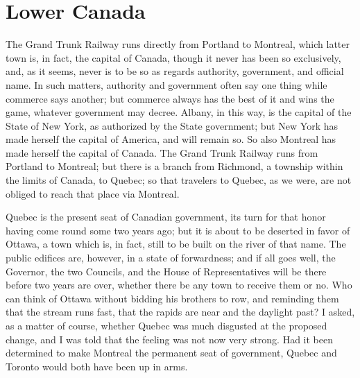 \chapter{Lower Canada}


The Grand Trunk Railway runs directly from Portland to Montreal,
which latter town is, in fact, the capital of Canada, though it
never has been so exclusively, and, as it seems, never is to be so
as regards authority, government, and official name.  In such
matters, authority and government often say one thing while
commerce says another; but commerce always has the best of it and
wins the game, whatever government may decree.  Albany, in this
way, is the capital of the State of New York, as authorized by the
State government; but New York has made herself the capital of
America, and will remain so.  So also Montreal has made herself the
capital of Canada.  The Grand Trunk Railway runs from Portland to
Montreal; but there is a branch from Richmond, a township within
the limits of Canada, to Quebec; so that travelers to Quebec, as we
were, are not obliged to reach that place via Montreal.

Quebec is the present seat of Canadian government, its turn for
that honor having come round some two years ago; but it is about to
be deserted in favor of Ottawa, a town which is, in fact, still to
be built on the river of that name.  The public edifices are,
however, in a state of forwardness; and if all goes well, the
Governor, the two Councils, and the House of Representatives will
be there before two years are over, whether there be any town to
receive them or no.  Who can think of Ottawa without bidding his
brothers to row, and reminding them that the stream runs fast, that
the rapids are near and the daylight past?  I asked, as a matter of
course, whether Quebec was much disgusted at the proposed change,
and I was told that the feeling was not now very strong.  Had it
been determined to make Montreal the permanent seat of government,
Quebec and Toronto would both have been up in arms.

